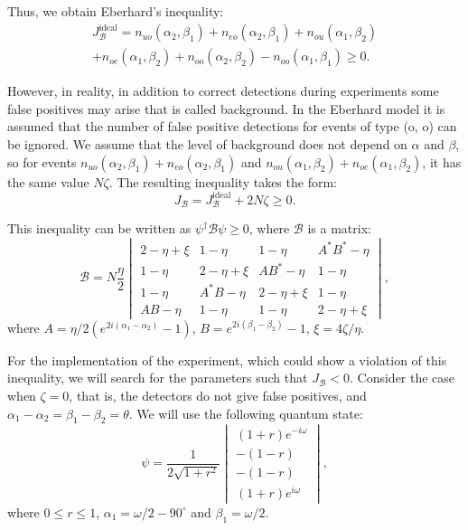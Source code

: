\documentclass[%
master,         %
subf,           %
href,           %
colorlinks=true %
]{disser}
\numberwithin{equation}{section}
\numberwithin{figure}{section}
\begin{document}
Thus, we obtain Eberhard's inequality:
\begin{multline*}
J_{\mathcal{B}}^{\mbox{ideal}} = n_{uo}(\alpha_2, \beta_1) + n_{eo}(\alpha_2, \beta_1) + n_{ou}(\alpha_1, \beta_2) \\
+ n_{oe}(\alpha_1, \beta_2) + n_{oo}(\alpha_2, \beta_2) - n_{oo}(\alpha_1, \beta_1) \geq 0.
\end{multline*}

However, in reality, in addition to correct detections during experiments some false positives may arise that is called background. In the Eberhard model it is assumed that the number of false positive detections for events of type (o, o) can be ignored. We assume that the level of background does not depend on $\alpha$ and $\beta$, so for events $n_{uo}(\alpha_2, \beta_1) + n_{eo}(\alpha_2, \beta_1)$ and $n_{ou}(\alpha_1, \beta_2) + n_{oe}(\alpha_1, \beta_2)$, it has the same value $N\zeta$. The resulting inequality takes the form:
\[
J_{\mathcal{B}} = J_{\mathcal{B}}^{\mbox{ideal}} + 2N\zeta \geq 0.
\]

This inequality can be written as $\psi^\dagger\mathcal{B}\psi \geq 0$, where $\mathcal{B}$ is a matrix:
\[
\mathcal{B} = N \dfrac{\eta}{2}
\begin{vmatrix}
2 - \eta + \xi & 1 - \eta & 1 - \eta & A^*B^* - \eta\\
1 - \eta & 2 - \eta + \xi & AB^* - \eta & 1 - \eta\\
1 - \eta & A^*B - \eta & 2 - \eta + \xi & 1 - \eta\\
AB - \eta & 1 - \eta & 1 - \eta & 2 - \eta + \xi
\end{vmatrix},
\]
where $A = \eta/2(e^{2i(\alpha_1-\alpha_2)} - 1)$, $B = e^{2i(\beta_1 - \beta_2)} -1$, $\xi = 4\zeta/\eta$.

For the implementation of the experiment, which could show a violation of this inequality, we will search for the parameters such that $J_{\mathcal{B}} < 0$. Consider the case when $\zeta = 0$, that is, the detectors do not give false positives, and $\alpha_1 - \alpha_2 = \beta_1 - \beta_2 = \theta$. We will use the following quantum state:
\[
\psi = \frac{1}{2\sqrt{1 + r^2}}
\begin{vmatrix}
(1+r)e^{-i\omega}\\
-(1 - r)\\
-(1 - r)\\
(1 + r)e^{i\omega}
\end{vmatrix},
\]
where $0 \leq r \leq 1$, $\alpha_1 = \omega / 2 - 90^\circ$ and $\beta_1 = \omega / 2$.
\end{document}
